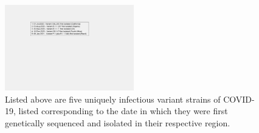 \documentclass[]{article}
\begin{document}
\begin{figure}[!h]
	\centering
	\includegraphics[width=0.50\textwidth]{legends/variant_strains_legend.png}
	\caption{Listed above are five uniquely infectious variant strains of COVID-19, listed corresponding to the date in which they were first genetically sequenced and isolated in their respective region.   }
	\label{fig:legends/variant_strains_legendLabel}
\end{figure}
\end{document}
